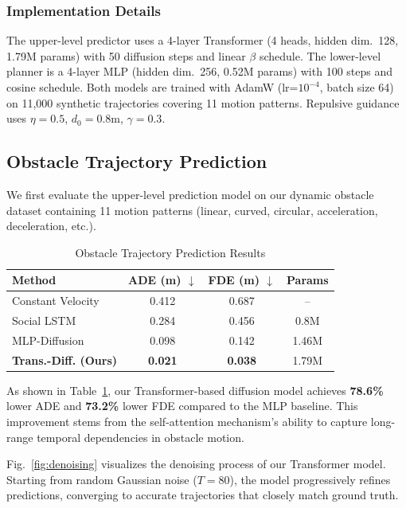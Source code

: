 \documentclass[letterpaper, 10 pt, conference]{ieeeconf}
\begin{document}
\subsubsection{Implementation Details}
The upper-level predictor uses a 4-layer Transformer (4 heads, hidden dim.~128, 1.79M params) with 50 diffusion steps and linear $\beta$ schedule. The lower-level planner is a 4-layer MLP (hidden dim.~256, 0.52M params) with 100 steps and cosine schedule. Both models are trained with AdamW (lr=$10^{-4}$, batch size 64) on 11,000 synthetic trajectories covering 11 motion patterns. Repulsive guidance uses $\eta = 0.5$, $d_0 = 0.8$m, $\gamma = 0.3$.

\subsection{Obstacle Trajectory Prediction}

We first evaluate the upper-level prediction model on our dynamic obstacle dataset containing 11 motion patterns (linear, curved, circular, acceleration, deceleration, etc.).

\begin{table}[t]
    \centering
    \caption{Obstacle Trajectory Prediction Results}
    \label{tab:prediction}
    \begin{tabular*}{\columnwidth}{@{\extracolsep{\fill}}lccc@{}}
        \toprule
        \textbf{Method} & \textbf{ADE (m)} $\downarrow$ & \textbf{FDE (m)} $\downarrow$ & \textbf{Params} \\
        \midrule
        Constant Velocity & 0.412 & 0.687 & -- \\
        Social LSTM~\cite{alahi2016social} & 0.284 & 0.456 & 0.8M \\
        MLP-Diffusion & 0.098 & 0.142 & 1.46M \\
        \textbf{Trans.-Diff. (Ours)} & \textbf{0.021} & \textbf{0.038} & 1.79M \\
        \bottomrule
    \end{tabular*}
\end{table}

As shown in Table~\ref{tab:prediction}, our Transformer-based diffusion model achieves \textbf{78.6\%} lower ADE and \textbf{73.2\%} lower FDE compared to the MLP baseline. This improvement stems from the self-attention mechanism's ability to capture long-range temporal dependencies in obstacle motion.

Fig.~\ref{fig:denoising} visualizes the denoising process of our Transformer model. Starting from random Gaussian noise ($T=80$), the model progressively refines predictions, converging to accurate trajectories that closely match ground truth.
\end{document}
